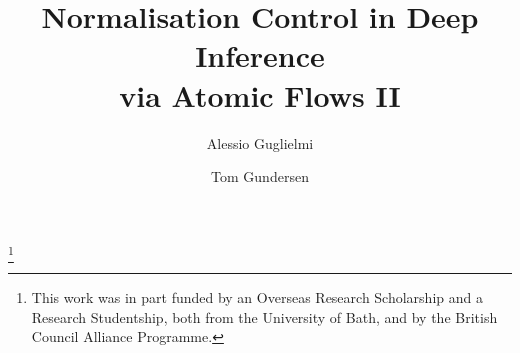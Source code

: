 \documentclass[a4paper]{amsart}
\newif\iflmcs\lmcsfalse %
\theoremstyle{remark}
\theoremstyle{definition}
\begin{document}
\title[Normalisation Control in Deep Inference   via Atomic Flows II]
      {Normalisation Control in Deep Inference\\ via Atomic Flows II}

\author{Alessio Guglielmi}

\author{Tom Gundersen}
\iflmcs\address{University of Bath, Bath BA2 7AY, UK}\fi

\thanks{This work was in part funded by an Overseas Research Scholarship and a Research Studentship, both from the University of Bath, and by the British Council Alliance Programme.}





\newcommand{\ot}{\mathbin\shortleftarrow}
\newcommand{\fff}{\mathsf f}
\newcommand{\ttt}{\mathsf t}
\newcommand{\ai}{\mathsf{ai}}
\newcommand{\aw}{\mathsf{aw}}
\newcommand{\ac}{\mathsf{ac}}
\newcommand{\aid}{{\ai{\downarrow}}}
\newcommand{\awd}{{\aw{\downarrow}}}
\newcommand{\acd}{{\ac{\downarrow}}}
\newcommand{\aiu}{{\ai{\uparrow}}}
\newcommand{\awu}{{\aw{\uparrow}}}
\newcommand{\acu}{{\ac{\uparrow}}}
\newcommand{\swi}{\mathsf{s}}
\newcommand{\med}{\mathsf{m}}
\newcommand{\sus}{\mathsf{ss}}
\newcommand{\said}{\mathsf{s}\aid}
\newcommand{\contr}{\mathsf{c}}
\newcommand{\cod}{{\contr{\downarrow}}}
\newcommand{\cou}{{\contr{\uparrow}}}
\newcommand{\SKS}{\mathsf{SKS}}
\newcommand{\ppl  }{{\mathchoice{\scriptstyle+}
                                {\scriptstyle+}
                                {\scriptstyle+}
                                {\scriptscriptstyle+}}}
\newcommand{\pmi  }{{\mathchoice{\scriptstyle-}
                                {\scriptstyle-}
                                {\scriptstyle-}
                                {\scriptscriptstyle-}}}
\end{document}
